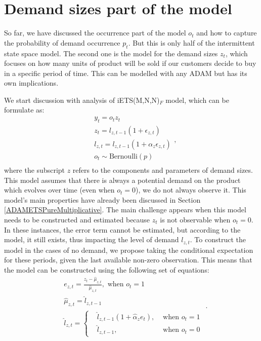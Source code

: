 \documentclass[]{book}
\theoremstyle{definition}
\theoremstyle{definition}
\theoremstyle{definition}
\theoremstyle{definition}
\theoremstyle{remark}
\begin{document}
\hypertarget{ADAMDemandSizes}{%
\section{Demand sizes part of the model}\label{ADAMDemandSizes}}

So far, we have discussed the occurrence part of the model \(o_t\) and how to capture the probability of demand occurrence \(p_t\). But this is only half of the intermittent state space model. The second one is the model for the demand sizes \(z_t\), which focuses on how many units of product will be sold if our customers decide to buy in a specific period of time. This can be modelled with any ADAM but has its own implications.

We start discussion with analysis of iETS(M,N,N)\(_F\) model, which can be formulate as:
\begin{equation}
\begin{aligned}
& y_t = o_t z_t  \\
& z_t = l_{z,t-1}(1 + \epsilon_{z,t}) \\
& l_{z,t} = l_{z,t-1}(1  + \alpha_{z} \epsilon_{z,t}) \\
& o_t \sim \text{Bernoulli}(p) \\
\end{aligned},
\label{eq:iETSMNNFixed}
\end{equation}
where the subscript \(z\) refers to the components and parameters of demand sizes. This model assumes that there is always a potential demand on the product which evolves over time (even when \(o_t=0\)), we do not always observe it. This model's main properties have already been discussed in Section \ref{ADAMETSPureMultiplicative}. The main challenge appears when this model needs to be constructed and estimated because \(z_t\) is not observable when \(o_t=0\). In these instances, the error term cannot be estimated, but according to the model, it still exists, thus impacting the level of demand \(l_{z,t}\). To construct the model in the cases of no demand, we propose taking the conditional expectation for these periods, given the last available non-zero observation. This means that the model can be constructed using the following set of equations:
\begin{equation}
\begin{aligned}
& e_{z,t} = \frac{z_t -\hat{\mu}_{z,t}}{\hat{\mu}_{z,t}}, \text{ when } o_t=1 \\
& \hat{\mu}_{z,t} = \hat{l}_{z,t-1} \\
& \hat{l}_{z,t} = 
\left \lbrace \begin{aligned}
& \hat{l}_{z,t-1} (1 + \hat{\alpha}_z e_t ), & \text{ when } o_t=1 \\
& \hat{l}_{z,t-1} , & \text{ when } o_t=0
\end{aligned} \right.
\end{aligned}.
\label{eq:iETSMNNFixedConstruction}
\end{equation}
\end{document}

